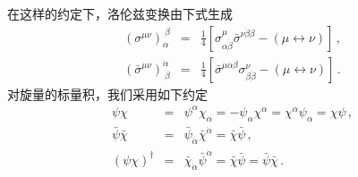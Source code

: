 在这样的约定下，洛伦兹变换由下式生成
\begin{eqnarray}
(\sigma^{\mu\nu})_\alpha^{~\beta} & = & \frac{1}{4}
[\sigma^\mu_{\alpha \dot{\beta}} \bar{\sigma}^{\nu\dot{\beta}\beta}- 
(\mu \leftrightarrow \nu)]\,, \nonumber \\
(\bar{\sigma}^{\mu\nu})^{\dot{\alpha}}_{\dot{~\beta}}&=&\frac{1}{4}
[\bar{\sigma}^{\mu\dot{\alpha}\beta}\sigma^\nu_{\beta\dot{\beta}}-
(\mu\leftrightarrow \nu)]\,.\nonumber
\end{eqnarray}
对旋量的标量积，我们采用如下约定
\begin{eqnarray}
\psi \chi &= & \psi^{\alpha} \chi_{\alpha} = - \psi_{\alpha}
\chi^{\alpha} = \chi^{\alpha} \psi_{\alpha} = \chi \psi\,,\nonumber\\ 
\bar{\psi} \bar{\chi} &=& \bar{\psi}_{\dot{\alpha}} 
\bar{\chi}^{\dot{\alpha}} =\bar{\chi} \bar{\psi}\,,\nonumber \\
(\psi\chi)^\dagger&=&\bar{\chi}_{\dot{\alpha}}\bar{\psi}^{\dot{\alpha}}
=\bar{\chi}\bar{\psi}=\bar{\psi}\bar{\chi}\,. \nonumber
\end{eqnarray}


